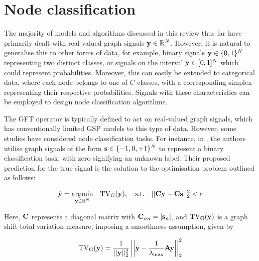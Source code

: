 







\section{Node classification}

The majority of models and algorithms discussed in this review thus far have primarily dealt with real-valued graph signals $\mathbf{y} \in \mathbb{R}^N$. However, it is natural to generalise this to other forms of data, for example, binary signals $\mathbf{y} \in \{0, 1\}^N$ representing two distinct classes, or signals on the interval $\mathbf{y} \in [0, 1]^N$ which could represent probabilities. Moreover, this can easily be extended to categorical data, where each node belongs to one of $C$ classes, with a corresponding simplex representing their respective probabilities. Signals with these characteristics can be employed to design node classification algorithms. 

The GFT operator is typically defined to act on real-valued graph signals, which has conventionally limited GSP models to this type of data. However, some studies have considered node classification tasks. For instance, in \cite{Sandryhaila2013a}, the authors utilise graph signals of the form $\mathbf{s} \in \{-1, 0, +1\}^N$ to represent a binary classification task, with zero signifying an unknown label. Their proposed prediction for the true signal is the solution to the optimisation problem outlined as follows:

\begin{equation}
    \hat{\mathbf{y}} = \underset{\mathbf{y} \in \mathbb{R}^N}{\text{argmin}}\quad \text{TV}_\text{G}(\mathbf{y}), \quad \text{s.t.} \quad ||\mathbf{C} \mathbf{y} - \mathbf{C} \mathbf{s} ||^2_2 < \epsilon
\end{equation}

Here, $\mathbf{C}$ represents a diagonal matrix with $\mathbf{C}_{nn} = |\mathbf{s}_n|$, and $\text{TV}_\text{G}(\mathbf{y})$ is a graph shift total variation measure, imposing a smoothness assumption, given by

\begin{equation}
    \text{TV}_\text{G}(\mathbf{y}) = \frac{1}{||\mathbf{y}||^2_2} \left| \left| \mathbf{y} - \frac{1}{\lambda_{\text{max}}} \mathbf{A} \mathbf{y} \right| \right|^2_2
\end{equation}

